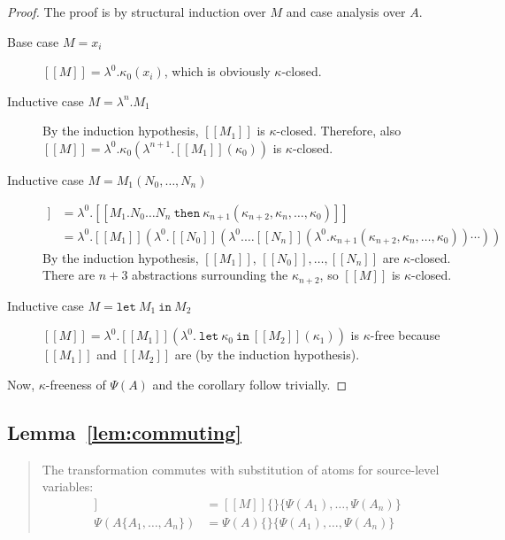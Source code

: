\documentclass[a4paper,11pt,draft]{article}
\newcommand{\kw}[1]{\mathtt{#1}}
\begin{document}
\begin{proof}
The proof is by structural induction over $M$ and case analysis over $A$.

\begin{description}
\item[\sffamily Base case $M = x_{i}$]\hfill

  $[\![M]\!] = \lambda^{0}.\kappa_{0}(x_{i})$, which is obviously $\kappa$-closed.

\item[\sffamily Inductive case $M = \lambda^{n}.M_{1}$]\hfill

  By the induction hypothesis, $[\![M_{1}]\!]$ is $\kappa$-closed. Therefore, also
  $[\![M]\!] = \lambda^{0}.\kappa_{0}(\lambda^{n+1}.[\![M_{1}]\!](\kappa_{0}))$ is
  $\kappa$-closed.

\item[\sffamily Inductive case $M = M_{1}(N_{0}, \ldots, N_{n})$]\hfill
  \begin{align*}
    [\![M]\!] &= \lambda^{0}.[\![M_{1}.N_{0} \ldots N_{n} \: \kw{then} \: \kappa_{n+1}(\kappa_{n+2}, \kappa_{n}, \ldots, \kappa_{0})]\!] \\
              &= \lambda^{0}.[\![M_{1}]\!](\lambda^{0}.[\![N_{0}]\!](\lambda^{0}. \ldots [\![N_{n}]\!](\lambda^{0}.\kappa_{n+1}(\kappa_{n+2}, \kappa_{n}, \ldots, \kappa_{0})) \cdots ))
  \end{align*}
  By the induction hypothesis, $[\![M_{1}]\!]$, $[\![N_{0}]\!], \ldots, [\![N_{n}]\!]$ are $\kappa$-closed.
  There are $n+3$ abstractions surrounding the $\kappa_{n+2}$, so $[\![M]\!]$ is $\kappa$-closed.

\item[\sffamily Inductive case $M = \kw{let} \: M_{1} \: \kw{in} \: M_{2}$]\hfill

  $[\![M]\!] = \lambda^{0}.[\![M_{1}]\!](\lambda^{0}. \: \kw{let} \: \kappa_{0} \: \kw{in} \: [\![M_{2}]\!](\kappa_{1}))$
  is $\kappa$-free because $[\![M_{1}]\!]$ and $[\![M_{2}]\!]$ are (by the induction hypothesis).
\end{description}

Now, $\kappa$-freeness of $\Psi(A)$ and the corollary follow trivially.
\end{proof}


\subsection{Lemma~\ref{lem:commuting}}

\begin{quote}
  The transformation commutes with substitution of atoms for source-level variables:
  \begin{align*}
    [\![M\{A_{1}, \ldots, A_{n}\}]\!] &= [\![M]\!]\{\}\{\Psi(A_{1}), \ldots, \Psi(A_{n})\} \\
    \Psi(A\{A_{1}, \ldots, A_{n}\})   &= \Psi(A)\{\}\{\Psi(A_{1}), \ldots, \Psi(A_{n})\}
  \end{align*}
\end{quote}
\end{document}
